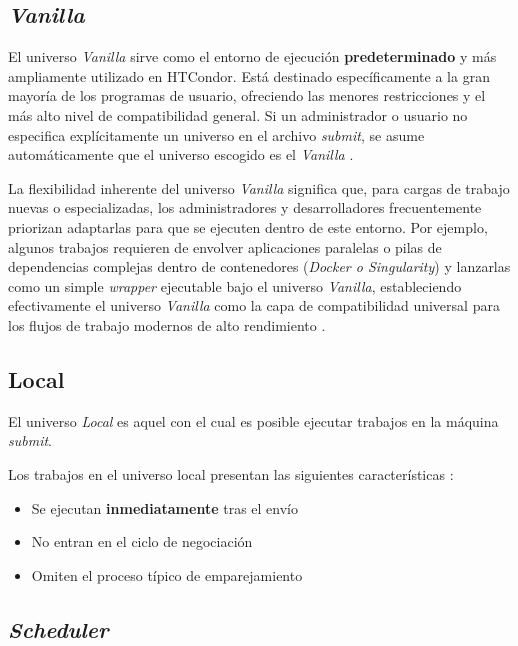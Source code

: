 \subsection{\textit{Vanilla}}

El universo \textit{Vanilla} sirve como el entorno de ejecución \textbf{predeterminado} y más ampliamente utilizado en HTCondor. Está destinado específicamente a la gran mayoría de los programas de usuario, ofreciendo las menores restricciones y el más alto nivel de compatibilidad general. Si un administrador o usuario no especifica explícitamente un universo en el archivo \textit{submit}, se asume automáticamente que el universo escogido es el \textit{Vanilla} \citep{CERNBatchDocs}.



La flexibilidad inherente del universo \textit{Vanilla} significa que, para cargas de trabajo nuevas o especializadas, los administradores y desarrolladores frecuentemente priorizan adaptarlas para que se ejecuten dentro de este entorno. Por ejemplo, algunos trabajos requieren de envolver aplicaciones paralelas o pilas de dependencias complejas dentro de contenedores (\textit{Docker o Singularity}) y lanzarlas como un simple \textit{wrapper} ejecutable bajo el universo \textit{Vanilla}, estableciendo efectivamente el universo \textit{Vanilla} como la capa de compatibilidad universal para los flujos de trabajo modernos de alto rendimiento \citep{Emilio_DockerHTCondor, HTCondor_Parallel}.


\subsection{Local}

El universo \textit{Local} es aquel con el cual es posible ejecutar trabajos en la máquina \textit{submit}.

Los trabajos en el universo local presentan las siguientes características \citep{HTCondor-choosing-universe}:

\begin{itemize}
	\item Se ejecutan \textbf{inmediatamente} tras el envío
	\item No entran en el ciclo de negociación
	\item Omiten el proceso típico de emparejamiento
\end{itemize}


\subsection{\textit{Scheduler}}

